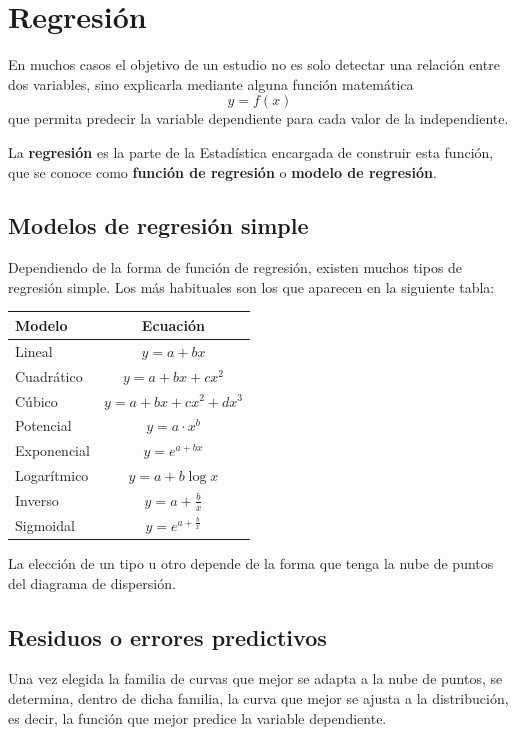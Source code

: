 \documentclass[
  a4paper,
]{scrreport}
\theoremstyle{plain}
\theoremstyle{definition}
\theoremstyle{definition}
\theoremstyle{remark}
\begin{document}
\section{Regresión}\label{regresiuxf3n-1}

En muchos casos el objetivo de un estudio no es solo detectar una
relación entre dos variables, sino explicarla mediante alguna función
matemática \[y=f(x)\] que permita predecir la variable dependiente para
cada valor de la independiente.

La \textbf{regresión} es la parte de la Estadística encargada de
construir esta función, que se conoce como \textbf{función de regresión}
o \textbf{modelo de regresión}.

\subsection{Modelos de regresión
simple}\label{modelos-de-regresiuxf3n-simple}

Dependiendo de la forma de función de regresión, existen muchos tipos de
regresión simple. Los más habituales son los que aparecen en la
siguiente tabla:

\begin{longtable}[]{@{}lc@{}}
\toprule\noalign{}
\textbf{Modelo} & \textbf{Ecuación} \\
\midrule\noalign{}
\endhead
\bottomrule\noalign{}
\endlastfoot
Lineal & \(y=a+bx\) \\
Cuadrático & \(y=a+bx+cx^2\) \\
Cúbico & \(y=a+bx+cx^2+dx^3\) \\
Potencial & \(y=a\cdot x^b\) \\
Exponencial & \(y=e^{a+bx}\) \\
Logarítmico & \(y=a+b\log x\) \\
Inverso & \(y=a+\frac{b}{x}\) \\
Sigmoidal & \(y=e^{a+\frac{b}{x}}\) \\
\end{longtable}

La elección de un tipo u otro depende de la forma que tenga la nube de
puntos del diagrama de dispersión.

\subsection{Residuos o errores
predictivos}\label{residuos-o-errores-predictivos}

Una vez elegida la familia de curvas que mejor se adapta a la nube de
puntos, se determina, dentro de dicha familia, la curva que mejor se
ajusta a la distribución, es decir, la función que mejor predice la
variable dependiente.
\end{document}
